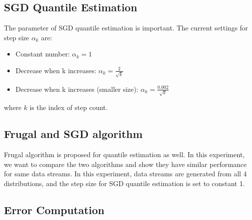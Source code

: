 \documentclass[12pt]{article}
\begin{document}
\subsection{SGD Quantile Estimation}

The parameter of SGD quantile estimation is important. The current settings for step size $\alpha_k$ are:
\begin{itemize}
    \item Constant number: $\alpha_k =1$
    \item Decrease when k increases: $\alpha_k = \frac{2}{\sqrt{k}}$
    \item Decrease when k increases (smaller size): $\alpha_k = \frac{0.002}{\sqrt{k}}$
\end{itemize}
where $k$ is the index of step count.
\subsection{Frugal and SGD algorithm}

Frugal algorithm is proposed for quantile estimation as well. In this experiment, we want to compare the two algorithms and show they have similar performance for same data streams. In this experiment, data streams are generated from all 4 distributions, and the step size for SGD quantile estimation is set to constant 1.

\subsection{Error Computation}
\end{document}
